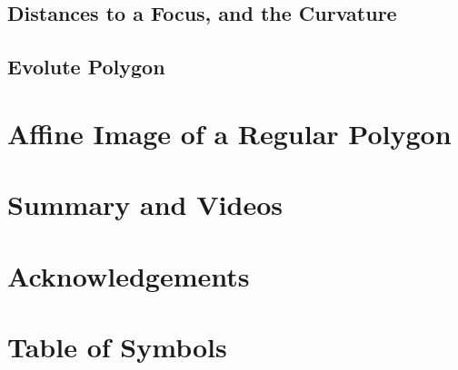 \documentclass{scrartcl}
\begin{document}
\subsection{Distances to a Focus, and the Curvature}
\label{sec:focuspocus}


\subsection{Evolute Polygon}
\label{sec:evolute}


\section{Affine Image of a Regular Polygon}
 

%

\section{Summary and Videos}
\label{sec:video-table}


\section*{Acknowledgements}


\appendix

\section{Table of Symbols}

\label{app:symbols}


 

\clearpage

\end{document}

